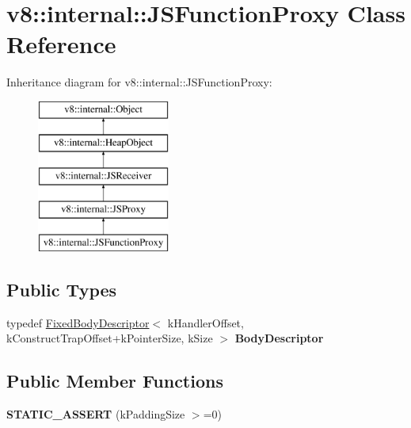 \hypertarget{classv8_1_1internal_1_1_j_s_function_proxy}{}\section{v8\+:\+:internal\+:\+:J\+S\+Function\+Proxy Class Reference}
\label{classv8_1_1internal_1_1_j_s_function_proxy}
Inheritance diagram for v8\+:\+:internal\+:\+:J\+S\+Function\+Proxy\+:\begin{figure}[H]
\begin{center}
\leavevmode
\includegraphics[height=5.000000cm]{classv8_1_1internal_1_1_j_s_function_proxy}
\end{center}
\end{figure}
\subsection*{Public Types}
\begin{DoxyCompactItemize}
\item 
\hypertarget{classv8_1_1internal_1_1_j_s_function_proxy_a3abb2a93eca4f8b6311aa7a09cca422e}{}typedef \hyperlink{classv8_1_1internal_1_1_fixed_body_descriptor}{Fixed\+Body\+Descriptor}$<$ k\+Handler\+Offset, k\+Construct\+Trap\+Offset+k\+Pointer\+Size, k\+Size $>$ {\bfseries Body\+Descriptor}\label{classv8_1_1internal_1_1_j_s_function_proxy_a3abb2a93eca4f8b6311aa7a09cca422e}

\end{DoxyCompactItemize}
\subsection*{Public Member Functions}
\begin{DoxyCompactItemize}
\item 
\hypertarget{classv8_1_1internal_1_1_j_s_function_proxy_a877f5867b95e01138f3c82ac461677b6}{}{\bfseries S\+T\+A\+T\+I\+C\+\_\+\+A\+S\+S\+E\+R\+T} (k\+Padding\+Size $>$=0)\label{classv8_1_1internal_1_1_j_s_function_proxy_a877f5867b95e01138f3c82ac461677b6}

\end{DoxyCompactItemize}
